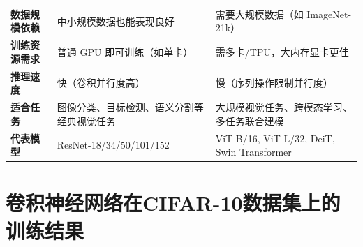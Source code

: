 \documentclass[UTF8]{report}
\theoremstyle{MyLineTheoremStyle} %
\theoremstyle{MyBlockTheoremStyle} %
\theoremstyle{MySubsubsectionStyle} %
\begin{document}
\begin{longtable}{@{}p{}p{}p{}@{}}
\textbf{数据规模依赖}       & 中小规模数据也能表现良好                       & 需要大规模数据（如 ImageNet-21k）           \\
\textbf{训练资源需求}       & 普通 GPU 即可训练（如单卡）                    & 需多卡/TPU，大内存显卡更佳                  \\
\textbf{推理速度}           & 快（卷积并行度高）                             & 慢（序列操作限制并行度）                     \\
\textbf{适合任务}           & 图像分类、目标检测、语义分割等经典视觉任务     & 大规模视觉任务、跨模态学习、多任务联合建模   \\
\textbf{代表模型}           & ResNet-18/34/50/101/152                        & ViT-B/16, ViT-L/32, DeiT, Swin Transformer    \\
\bottomrule
\end{longtable}



\cleardoublepage


\section{卷积神经网络在CIFAR-10数据集上的训练结果}  
\end{document}
